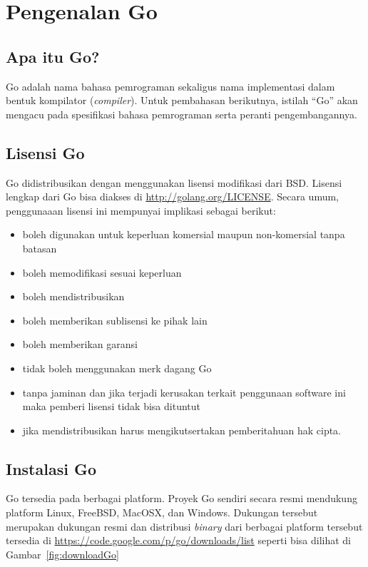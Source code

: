 \chapter{Pengenalan Go}

\section{Apa itu Go?}

Go adalah nama bahasa pemrograman sekaligus nama implementasi dalam bentuk kompilator (\textit{compiler}). Untuk pembahasan berikutnya, istilah ``Go'' akan mengacu pada spesifikasi bahasa pemrograman serta peranti pengembangannya.

\section{Lisensi Go}

Go didistribusikan dengan menggunakan lisensi modifikasi dari BSD. Lisensi lengkap dari Go bisa diakses di \url{http://golang.org/LICENSE}. Secara umum, penggunaaan lisensi ini mempunyai implikasi sebagai berikut:
\begin{itemize}
\item boleh digunakan untuk keperluan komersial maupun non-komersial tanpa batasan
\item boleh memodifikasi sesuai keperluan
\item boleh mendistribusikan
\item boleh memberikan sublisensi ke pihak lain
\item boleh memberikan garansi
\item tidak boleh menggunakan merk dagang Go
\item tanpa jaminan dan jika terjadi kerusakan terkait penggunaan software ini maka pemberi lisensi tidak bisa dituntut
\item jika mendistribusikan harus mengikutsertakan pemberitahuan hak cipta.
\end{itemize}

\section{Instalasi Go}

Go tersedia pada berbagai platform. Proyek Go sendiri secara resmi mendukung platform Linux, FreeBSD, MacOSX, dan Windows. Dukungan tersebut merupakan dukungan resmi dan distribusi \textit{binary} dari berbagai platform tersebut tersedia di \url{https://code.google.com/p/go/downloads/list} seperti bisa dilihat di Gambar~\ref{fig:downloadGo}

